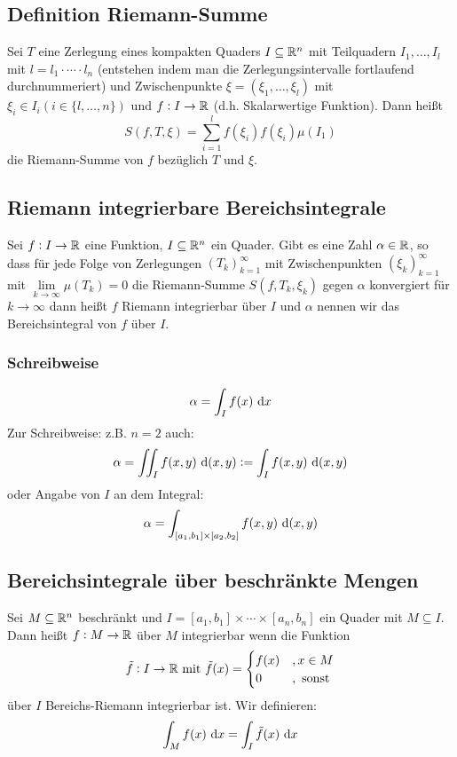 \subsection{Definition Riemann-Summe}
Sei $T$ eine Zerlegung eines kompakten Quaders $I \subseteq \mathbb{R}^n$ mit Teilquadern
$I_1, \ldots, I_l$ mit $l=l_1 \cdot \cdots \cdot l_n$ (entstehen indem man die
Zerlegungsintervalle fortlaufend durchnummeriert) und Zwischenpunkte
$\xi = (\xi_1, \ldots, \xi_l)$ mit $\xi_i \in I_i (i \in \{l, \ldots, n\})$
und $f: I \to \mathbb{R}$ (d.h. Skalarwertige Funktion). Dann heißt
\begin{equation*}
    S(f, T, \xi) = \sum_{i=1}^l f(\xi_i) f(\xi_i) \mu(I_1)
\end{equation*}
die Riemann-Summe von $f$ bezüglich $T$ und $\xi$.

\subsection{Riemann integrierbare Bereichsintegrale}
Sei $f: I \to \mathbb{R}$ eine Funktion, $I \subseteq \mathbb{R}^n$ ein Quader. Gibt es eine Zahl
$\alpha \in \mathbb{R}$, so dass für jede Folge von Zerlegungen ${(T_k)}_{k=1}^\infty$ mit
Zwischenpunkten ${(\xi_k)}_{k=1}^\infty$ mit $\lim\limits_{k \to \infty} \mu(T_k)=0$
die Riemann-Summe $S(f, T_k, \xi_k)$ gegen $\alpha$ konvergiert für $k \to \infty$
dann heißt $f$ Riemann integrierbar über $I$ und $\alpha$ nennen wir das
Bereichsintegral von $f$ über $I$.

\subsubsection{Schreibweise}
\begin{equation*}
    \alpha = \int_I f(x) \text{ d}x
\end{equation*}
Zur Schreibweise: z.B. $n=2$ auch:
\begin{equation*}
    \alpha = \iint_I f(x,y) \text{ d}(x,y) := \int_I f(x,y) \text{ d}(x,y)
\end{equation*}
oder Angabe von $I$ an dem Integral:
\begin{equation*}
    \alpha = \int_{[a_1, b_1]\times[a_2,b_2]} f(x,y) \text{ d}(x,y)
\end{equation*}

\subsection{Bereichsintegrale über beschränkte Mengen}
Sei $M \subseteq \mathbb{R}^n$ beschränkt und $I = [a_1, b_1] \times \cdots \times [a_n,
b_n]$ ein Quader mit $M \subseteq I$. Dann heißt $f: M \to \mathbb{R}$ über $M$ integrierbar
wenn die Funktion
\begin{equation*}
    \tilde{f}: I \to \mathbb{R} \text{ mit } \tilde{f}(x) =
    \begin{cases}
        f(x) &, x\in M\\
        0 &, \text{ sonst}
    \end{cases}
\end{equation*}
über $I$ Bereichs-Riemann integrierbar ist. Wir definieren:
\begin{equation*}
    \int_M f(x) \text{ d}x = \int_I \tilde{f}(x) \text{ d}x
\end{equation*}

